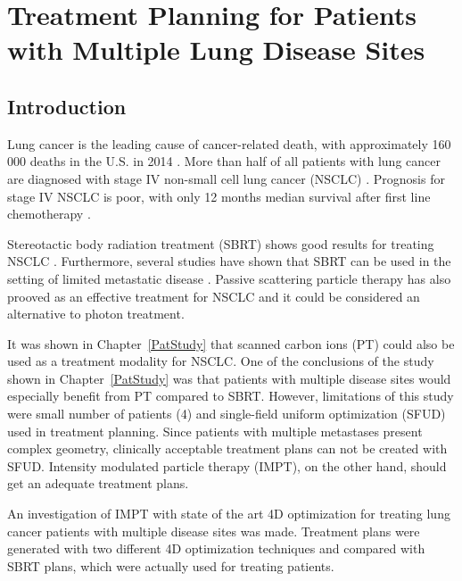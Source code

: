 \documentclass[type=dr, dr=rernat, accentcolor=tud7b,colorbacktitle, bigchapter, openright, twoside, 12pt ]{tudthesis}
\begin{document}
\chapter{Treatment Planning for Patients with Multiple Lung Disease Sites}
\label{chapter:vmm}
\minitoc

\section{Introduction}

Lung cancer is the leading cause of cancer-related death, with approximately 160 000 deaths in the U.S. in 2014 \cite{Siegel2014}.
More than half of all patients with lung cancer are diagnosed with stage IV non-small cell lung cancer (NSCLC) \cite{Ramalingam2008, Iyengar2014}.
Prognosis for stage IV NSCLC is poor, with only 12 months median survival after first line chemotherapy \cite{Socinski2013}. 

Stereotactic body radiation treatment (SBRT) shows good results for treating NSCLC \cite{Baumann2009, Fakiris2009, Grutters2010, Greco2011}. 
Furthermore, several studies have shown that SBRT can be used in the setting of limited metastatic 
disease \cite{Rusthoven2009, Villaruz2012, Salama2012, Iyengar2014}. 
Passive scattering particle therapy has also prooved as an effective treatment for NSCLC \cite{Grutters2010, Tsujii2012} and it could be considered an alternative
to photon treatment.

It was shown in Chapter~\ref{PatStudy} that scanned carbon ions (PT) could also be used as a treatment modality for NSCLC. One of the conclusions of the study shown in Chapter~\ref{PatStudy} 
was that patients with multiple disease sites would especially benefit from PT compared to SBRT. However, limitations of this study were small number of patients (4) and single-field uniform optimization (SFUD) used in treatment planning. 
Since patients with multiple metastases present complex geometry, clinically acceptable treatment plans can not be created with SFUD. Intensity modulated particle therapy (IMPT), on the other hand,
should get an adequate treatment plans.

An investigation of IMPT with state of the art 4D optimization for treating lung cancer patients with multiple disease sites was made. 
Treatment plans were generated with two different 4D optimization techniques and compared with SBRT plans, which were actually used for treating patients.


\newpage
\end{document}
